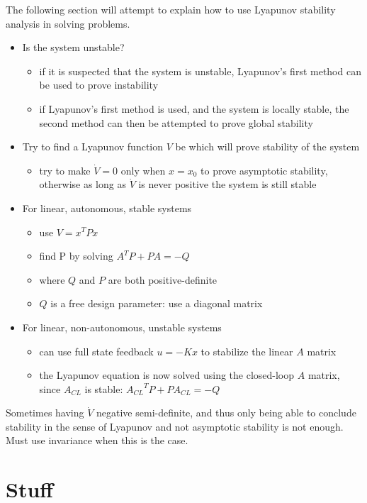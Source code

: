 The following section will attempt to explain how to use Lyapunov stability analysis in solving problems.
\begin{itemize}
  \item{Is the system unstable?}
  \begin{itemize}
    \item{if it is suspected that the system is unstable, Lyapunov's first method can be used to prove instability}
    \item{if Lyapunov's first method is used, and the system is locally stable, the second method can then be attempted to prove global stability}
  \end{itemize}
  \item{Try to find a Lyapunov function $V$ be which will prove stability of the system}
  \begin{itemize}
    \item{try to make $\dot{V} =0$ only when $x=x_{0}$ to prove asymptotic stability, otherwise as long as  $\dot{V}$ is never positive the system is still stable}
  \end{itemize}
  \item{For linear, autonomous, stable systems}
  \begin{itemize}
    \item{use $V=x^{T}Px$}
    \item{find P by solving $A^{T}P+PA=-Q$}
    \item{where $Q$ and $P$ are both positive-definite}
    \item{$Q$ is a free design parameter: use a diagonal matrix}
  \end{itemize}
  \item{For linear, non-autonomous, unstable systems}
  \begin{itemize}
    \item{can use full state feedback $u=-Kx$ to stabilize the linear $A$ matrix}
    \item{the Lyapunov equation is now solved using the closed-loop $A$ matrix, since $A_{CL}$ is stable: ${A_{CL}}^{T}P+PA_{CL}=-Q$}
  \end{itemize}
\end{itemize}

Sometimes having $\dot{V}$ negative semi-definite, and thus only being able to conclude stability in the sense of Lyapunov and not asymptotic stability is not enough.
Must use invariance when this is the case.

\section{Stuff}

